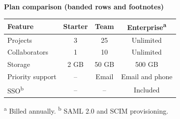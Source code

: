 \documentclass[10pt]{article}
\begin{document}
\vspace{1.4em}
\noindent
\begin{minipage}{\textwidth}
{\bfseries\color{accent} Plan comparison (banded rows and footnotes)}

\vspace{0.5em}
\begin{tabular}{@{}l ccc@{}}
\toprule
\textbf{Feature} & \textbf{Starter} & \textbf{Team} & \textbf{Enterprise\textsuperscript{a}} \\
\midrule
Projects           & 3          & 25          & Unlimited \\
Collaborators      & 1          & 10          & Unlimited \\
Storage            & 2 GB       & 50 GB       & 500 GB \\
Priority support   & --         & Email       & Email and phone \\
SSO\textsuperscript{b} & --     & --          & Included \\
\bottomrule
\end{tabular}

\vspace{0.5em}
{\footnotesize\textsuperscript{a} Billed annually. \textsuperscript{b} SAML 2.0 and SCIM provisioning.}
\end{minipage}
\end{document}
